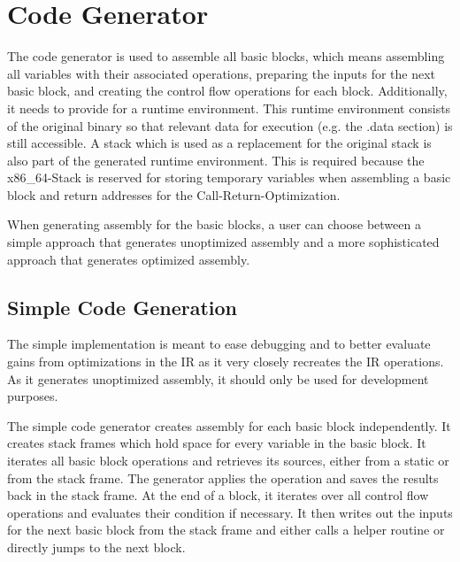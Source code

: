 \documentclass[course=eragp]{aspdoc}
\begin{document}
\section{Code Generator}\label{sec:generator}
The code generator is used to assemble all basic blocks, which means assembling all variables with their associated operations,
preparing the inputs for the next basic block, and creating the control flow operations for each block.
Additionally, it needs to provide for a runtime environment.
This runtime environment consists of the original binary so that relevant data for execution (e.g. the .data section) is still accessible.
A stack which is used as a replacement for the original stack is also part of the generated runtime environment.
This is required because the x86\_64-Stack is reserved for storing temporary variables when assembling a basic block and return addresses for the Call-Return-Optimization.

\par

When generating assembly for the basic blocks, a user can choose between a simple approach that generates unoptimized assembly
and a more sophisticated approach that generates optimized assembly.

\subsection{Simple Code Generation}\label{naive_generator}

The simple implementation is meant to ease debugging
and to better evaluate gains from
optimizations in the IR as it very closely recreates the IR operations.
As it generates unoptimized assembly, it should only be used for development purposes.

\par

The simple code generator creates assembly for each basic block independently.
It creates stack frames which hold space for every variable in the basic block. It iterates all
basic block operations and
retrieves its sources, either from a static or from the stack frame. The generator applies the
operation and saves the results back in the stack frame.
At the end of a block, it iterates over all control flow operations and evaluates their condition if
necessary. It then writes out the inputs for the next basic block
from the stack frame and either calls a helper routine or directly jumps to the next block.
\end{document}
